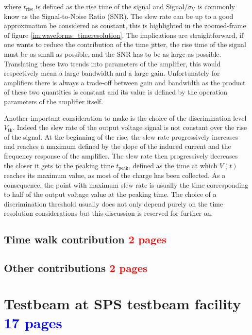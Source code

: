 		where $t_{\text{rise}}$ is defined as the rise time of the signal and Signal/$\sigma_{\text{V}}$ is commonly know as the Signal-to-Noise Ratio (SNR). The slew rate can be up to a good approximation be considered as constant, this is highlighted in the zoomed-frame of figure \ref{im:waveforms_timeresolution}. The implications are straightforward, if one wants to reduce the contribution of the time jitter, the rise time of the signal must be as small as possible, and the SNR has to be as large as possible. Translating these two trends into parameters of the amplifier, this would respectively mean a large bandwidth and a large gain. Unfortunately for amplifiers there is always a trade-off between gain and bandwidth as the product of these two quantities is constant and its value is defined by the operation parameters of the amplifier itself. 
	
		Another important consideration to make is the choice of the discrimination level $V_{\text{th}}$. Indeed the slew rate of the output voltage signal is not constant over the rise of the signal. At the beginning of the rise, the slew rate progressively increases and reaches a maximum defined by the slope of the induced current and the frequency response of the amplifier. The slew rate then progressively decreases the closer it gets to the peaking time $t_{\text{peak}}$, defined as the time at which $V(t)$ reaches its maximum value, as most of the charge has been collected. As a consequence, the point with maximum slew rate is usually the time corresponding to half of the output voltage value at the peaking time. The choice of a discrimination threshold usually does not only depend purely on the time resolution considerations but this discussion is reserved for further on. 
		
		
		\subsection{Time walk contribution \textcolor{red}{ 2 pages}}
		
		
		\subsection{Other contributions \textcolor{red}{ 2 pages}}
	
	\clearpage
	\section{ Testbeam at SPS testbeam facility \textcolor{blue}{ 17 pages}}
